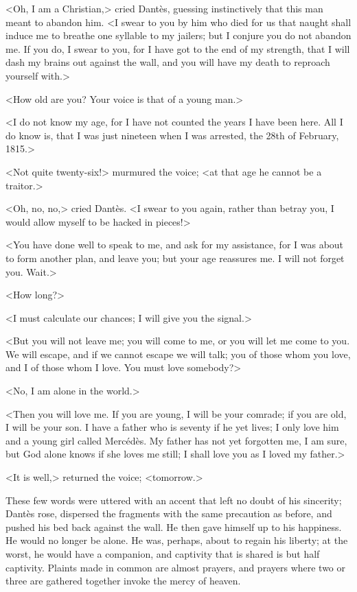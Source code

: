  <Oh, I am a Christian,> cried Dantès, guessing instinctively that this man meant to abandon him. <I swear to you by him who died for us that naught shall induce me to breathe one syllable to my jailers; but I conjure you do not abandon me. If you do, I swear to you, for I have got to the end of my strength, that I will dash my brains out against the wall, and you will have my death to reproach yourself with.> 

 <How old are you? Your voice is that of a young man.> 

 <I do not know my age, for I have not counted the years I have been here. All I do know is, that I was just nineteen when I was arrested, the 28th of February, 1815.> 

 <Not quite twenty-six!> murmured the voice; <at that age he cannot be a traitor.> 

 <Oh, no, no,> cried Dantès. <I swear to you again, rather than betray you, I would allow myself to be hacked in pieces!> 

 <You have done well to speak to me, and ask for my assistance, for I was about to form another plan, and leave you; but your age reassures me. I will not forget you. Wait.> 

 <How long?> 

 <I must calculate our chances; I will give you the signal.> 

 <But you will not leave me; you will come to me, or you will let me come to you. We will escape, and if we cannot escape we will talk; you of those whom you love, and I of those whom I love. You must love somebody?> 

 <No, I am alone in the world.> 

 <Then you will love me. If you are young, I will be your comrade; if you are old, I will be your son. I have a father who is seventy if he yet lives; I only love him and a young girl called Mercédès. My father has not yet forgotten me, I am sure, but God alone knows if she loves me still; I shall love you as I loved my father.> 

 <It is well,> returned the voice; <tomorrow.> 

 These few words were uttered with an accent that left no doubt of his sincerity; Dantès rose, dispersed the fragments with the same precaution as before, and pushed his bed back against the wall. He then gave himself up to his happiness. He would no longer be alone. He was, perhaps, about to regain his liberty; at the worst, he would have a companion, and captivity that is shared is but half captivity. Plaints made in common are almost prayers, and prayers where two or three are gathered together invoke the mercy of heaven. 

